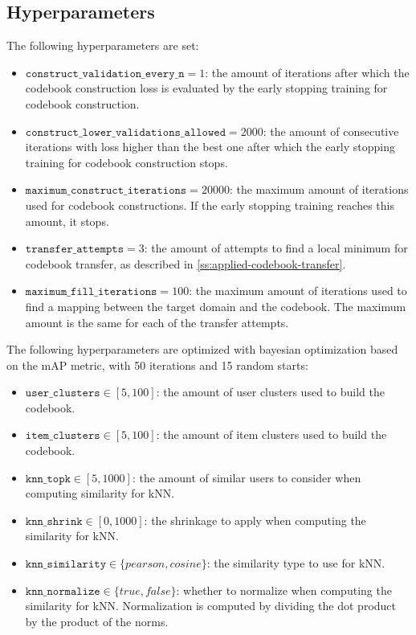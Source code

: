 \subsection{Hyperparameters}

The following hyperparameters are set:
\begin{itemize}
\item $\texttt{construct\_validation\_every\_n} = 1$: the amount of iterations after which the codebook construction loss is evaluated by the early stopping training for codebook construction.
\item $\texttt{construct\_lower\_validations\_allowed} = 2000$: the amount of consecutive iterations with loss higher than the best one after which the early stopping training for codebook construction stops.
\item $\texttt{maximum\_construct\_iterations} = 20000$: the maximum amount of iterations used for codebook constructions. If the early stopping training reaches this amount, it stops.
\item $\texttt{transfer\_attempts} = 3$: the amount of attempts to find a local minimum for codebook transfer, as described in \autoref{ss:applied-codebook-transfer}.
\item $\texttt{maximum\_fill\_iterations} = 100$: the maximum amount of iterations used to find a mapping between the target domain and the codebook. The maximum amount is the same for each of the transfer attempts.
\end{itemize}
The following hyperparameters are optimized with bayesian optimization based on the mAP metric, with 50 iterations and 15 random starts:
\begin{itemize}
\item $\texttt{user\_clusters} \in [5,100]$: the amount of user clusters used to build the codebook.
\item $\texttt{item\_clusters} \in [5,100]$: the amount of item clusters used to build the codebook.
\item $\texttt{knn\_topk} \in [5,1000]$: the amount of similar users to consider when computing similarity for kNN.
\item $\texttt{knn\_shrink} \in [0,1000]$: the shrinkage to apply when computing the similarity for kNN.
\item $\texttt{knn\_similarity} \in \{pearson,cosine\}$: the similarity type to use for kNN.
\item $\texttt{knn\_normalize} \in \{true,false\}$: whether to normalize when computing the similarity for kNN. Normalization is computed by dividing the dot product by the product of the norms.
\end{itemize}


